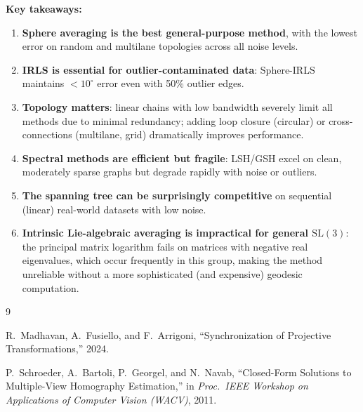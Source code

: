\documentclass[11pt, a4paper]{article}
\begin{document}
\noindent\textbf{Key takeaways:}
\begin{enumerate}[leftmargin=*]
    \item \textbf{Sphere averaging is the best general-purpose method}, with the
          lowest error on random and multilane topologies across all noise levels.
    \item \textbf{IRLS is essential for outlier-contaminated data}: Sphere-IRLS
          maintains $<10^\circ$ error even with 50\% outlier edges.
    \item \textbf{Topology matters}: linear chains with low bandwidth severely
          limit all methods due to minimal redundancy; adding loop closure
          (circular) or cross-connections (multilane, grid) dramatically improves
          performance.
    \item \textbf{Spectral methods are efficient but fragile}: LSH/GSH excel on
          clean, moderately sparse graphs but degrade rapidly with noise or
          outliers.
    \item \textbf{The spanning tree can be surprisingly competitive} on
          sequential (linear) real-world datasets with low noise.
    \item \textbf{Intrinsic Lie-algebraic averaging is impractical for general
          $\mathrm{SL}(3)$}: the principal matrix logarithm fails on matrices
          with negative real eigenvalues, which occur frequently in this group,
          making the method unreliable without a more sophisticated (and
          expensive) geodesic computation.
\end{enumerate}


\begin{thebibliography}{9}

R.~Madhavan, A.~Fusiello, and F.~Arrigoni,
``Synchronization of Projective Transformations,''
2024.

P.~Schroeder, A.~Bartoli, P.~Georgel, and N.~Navab,
``Closed-Form Solutions to Multiple-View Homography Estimation,''
in \emph{Proc.\ IEEE Workshop on Applications of Computer Vision (WACV)}, 2011.

\end{thebibliography}
\end{document}
